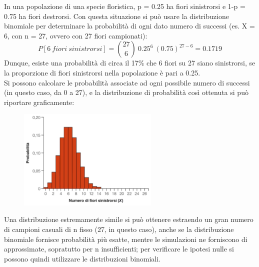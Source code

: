 \documentclass[10pt, draft]{book}
\newcounter{example}[section]
\begin{document}
\begin{example}
In una popolazione di una specie floristica, p = 0.25 ha fiori sinistrorsi e 1-p = 0.75 ha fiori destrorsi. Con questa situazione si può usare la distribuzione binomiale per determinare la probabilità di ogni dato numero di successi (es. X = 6, con n = 27, ovvero con 27 fiori campionati):
\begin{equation}
P[6 \ fiori \ sinistrorsi] = \binom{27}{6} \ 0.25^6 \ (0.75)^{27-6} = 0.1719
\end{equation}
Dunque, esiste una probabilità di circa il 17\% che 6 fiori su 27 siano sinistrorsi, se la proporzione di fiori sinistrorsi nella popolazione è pari a 0.25.
\\
Si possono calcolare le probabilità associate ad ogni possibile numero di successi (in questo caso, da 0 a 27), e la distribuzione di probabilità così ottenuta si può riportare graficamente:
    \begin{figure}[H]\label{fig7.1-1}
    \centering
    \includegraphics[width=0.6\textwidth]{fig7.1-1}
    \caption{\small{}}
    \end{figure}
Una distribuzione estremamente simile si può ottenere estraendo un gran numero di campioni casuali di n fisso (27, in questo caso), anche se la distribuzione binomiale fornisce probabilità più esatte, mentre le simulazioni ne forniscono di approssimate, sopratutto per n insufficienti; per verificare le ipotesi nulle si possono quindi utilizzare le distribuzioni binomiali.
\end{example}
\end{document}

